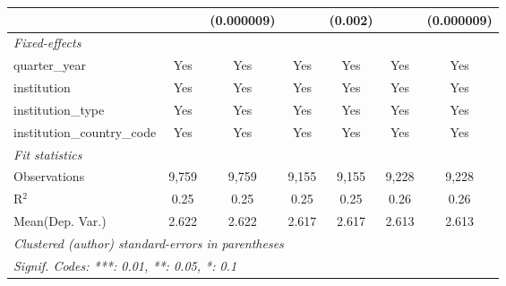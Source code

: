 \begin{tabular}{lcccccc}
                                      &               & (0.000009)    &               & (0.002)       &               & (0.000009)\\   
   \midrule
   \emph{Fixed-effects}\\
   quarter\_year                      & Yes           & Yes           & Yes           & Yes           & Yes           & Yes\\  
   institution                        & Yes           & Yes           & Yes           & Yes           & Yes           & Yes\\  
   institution\_type                  & Yes           & Yes           & Yes           & Yes           & Yes           & Yes\\  
   institution\_country\_code         & Yes           & Yes           & Yes           & Yes           & Yes           & Yes\\  
   \midrule
   \emph{Fit statistics}\\
   Observations                       & 9,759         & 9,759         & 9,155         & 9,155         & 9,228         & 9,228\\  
   R$^2$                              & 0.25          & 0.25          & 0.25          & 0.25          & 0.26          & 0.26\\  
Mean(Dep. Var.) & 2.622 & 2.622 & 2.617 & 2.617 & 2.613 & 2.613 \\
   \midrule \midrule
   \multicolumn{7}{l}{\emph{Clustered (author) standard-errors in parentheses}}\\
   \multicolumn{7}{l}{\emph{Signif. Codes: ***: 0.01, **: 0.05, *: 0.1}}\\
\end{tabular}
\par\endgroup
